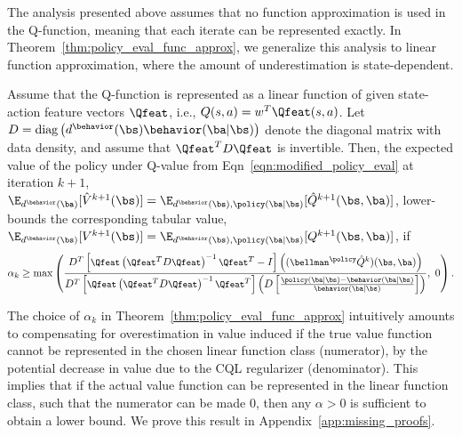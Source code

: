 The analysis presented above assumes that no function approximation is used in the Q-function, meaning that each iterate can be represented exactly.
In Theorem~\ref{thm:policy_eval_func_approx}, we generalize this analysis to linear function approximation, where the amount of underestimation is state-dependent.
\begin{theorem}
\label{thm:policy_eval_func_approx}
Assume that the Q-function is represented as a linear function of given state-action feature vectors $\Qfeat$, i.e., $Q(s, a) = w^T \Qfeat(s, a)$. Let $D = \text{diag}\left(d^\behavior(\bs) \behavior(\ba|\bs)\right)$ denote the diagonal matrix with data density, and assume that $\Qfeat^T D \Qfeat$ is invertible. Then, the expected value of the policy under Q-value from Eqn~\ref{eqn:modified_policy_eval} at iteration $k+1$, $\E_{d^\behavior(\ba)}[\hat{V}^{k+1}(\bs)] = \E_{d^\behavior(\bs), \policy(\ba|\bs)}[\hat{Q}^{k+1}(\bs, \ba)]$, lower-bounds the corresponding tabular value, $\E_{d^\behavior(\bs)}[V^{k+1}(\bs)] =\E_{d^\behavior(\bs), \policy(\ba|\bs)}[Q^{k+1}(\bs, \ba)]$, if
\begin{equation*}
\small{\alpha_k \geq \max \left(\frac{D^T\left[\Qfeat \left(\Qfeat^T D \Qfeat \right)^{-1} \Qfeat^T - I \right]\left((\bellman^\policy \hat{Q}^k)(\bs, \ba)\right)}{D^T\left[ \Qfeat \left(\Qfeat^T D \Qfeat \right)^{-1} \Qfeat^T \right] \left(D \left[\frac{\policy(\ba|\bs) - \behavior(\ba|\bs)}{\behavior(\ba|\bs)} \right] \right)},~ 0 \right).}
\end{equation*}
\end{theorem}
The choice of $\alpha_k$ in Theorem~\ref{thm:policy_eval_func_approx} intuitively amounts to compensating for overestimation in value induced if the true value function cannot be represented in the chosen linear function class (numerator), by the potential decrease in value due to the CQL regularizer (denominator). This implies that if the actual value function can be represented in the linear function class, such that the numerator can be made $0$, then any $\alpha > 0$ is sufficient to obtain a lower bound. We prove this result in Appendix~\ref{app:missing_proofs}. 

